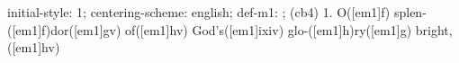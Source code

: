 initial-style: 1;
centering-scheme: english;
def-m1: \grealign;
(cb4) 1. O([em1]f) splen-([em1]f)dor([em1]gv) of([em1]hv) God's([em1]ixiv) glo-([em1]h)ry([em1]g) bright,([em1]hv)
